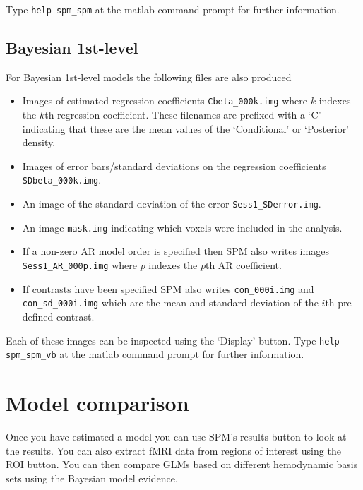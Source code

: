 Type \verb!help spm_spm! at the matlab command prompt for further information.

\subsection{Bayesian 1st-level}

For Bayesian 1st-level models the following files are also produced

\begin{itemize}

\item{Images of estimated regression coefficients  \verb!Cbeta_000k.img! where $k$ indexes the $k$th regression coefficient. These filenames are prefixed with a `C' indicating that these are the mean values of the `Conditional' or `Posterior' density.}

\item{Images of error bars/standard deviations on the regression coefficients \verb!SDbeta_000k.img!.}

\item{An image of the standard deviation of the error \verb!Sess1_SDerror.img!.}

\item{An image \verb!mask.img! indicating which voxels were included in the analysis.}

\item{If a non-zero AR model order is specified then SPM also writes images \verb!Sess1_AR_000p.img! where $p$ indexes the $p$th AR coefficient.}

\item{If contrasts have been specified SPM also writes \verb!con_000i.img! and \verb!con_sd_000i.img! which are the mean and standard deviation of the $i$th pre-defined contrast.} 

\end{itemize}

Each of these images can be inspected using the `Display' button. Type \verb!help spm_spm_vb! at the matlab command prompt for further information.

\section{Model comparison}

Once you have estimated a model you can use SPM's results button to look at the results. You can also extract fMRI data from regions of interest using the ROI button. You can then compare GLMs based on different hemodynamic basis sets using the Bayesian model evidence. 

